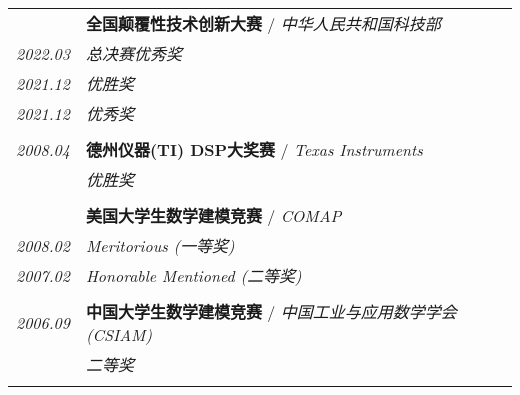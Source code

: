 \documentclass[paper=a4,fontsize=11pt]{scrartcl}
\begin{document}
\begin{longtable}{r|p{11cm}}
	
	~ & \textbf{全国颠覆性技术创新大赛} / \emph{中华人民共和国科技部}\\
	\emph{2022.03} & \emph{总决赛优秀奖}\\
	\emph{2021.12} & \emph{优胜奖}\\
	\emph{2021.12} & \emph{优秀奖}\\
	\multicolumn{2}{c}{} \\
	
	
	
	\emph{2008.04} & \textbf{德州仪器(TI) DSP大奖赛} / \emph{Texas Instruments} \\
	& \emph{优胜奖}\\
	\multicolumn{2}{c}{} \\
	
	
	~ & \textbf{美国大学生数学建模竞赛} / \emph{COMAP}\\
	\emph{2008.02} & \emph{Meritorious (一等奖)}\\
	
	
	\emph{2007.02} 	& \emph{Honorable Mentioned (二等奖)}\\
	\multicolumn{2}{c}{} \\
	
	
	\emph{2006.09} & \textbf{中国大学生数学建模竞赛} / \emph{中国工业与应用数学学会(CSIAM)}\\
	& \emph{二等奖}\\
\multicolumn{2}{c}{} 
	
	
\end{longtable}








\end{document}
